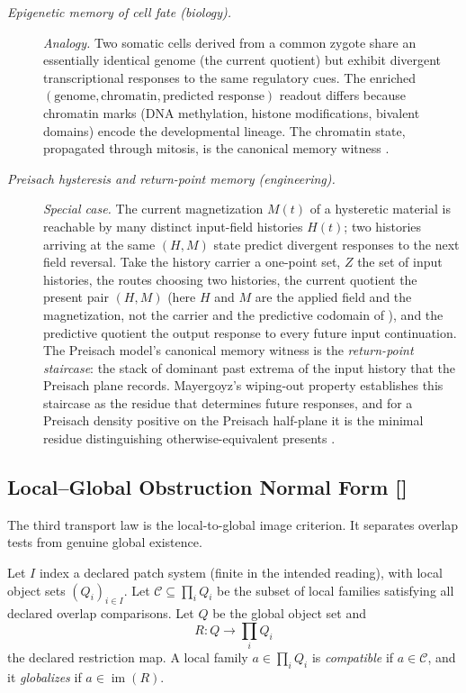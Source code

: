 \begin{description}
\item[\emph{Epigenetic memory of cell fate (biology).}] \textit{Analogy.}
Two somatic cells derived from a common zygote share an essentially
identical genome (the current quotient) but exhibit divergent
transcriptional responses to the same regulatory cues.  The
enriched
\((\text{genome}, \text{chromatin}, \text{predicted response})\)
readout differs because chromatin marks (DNA methylation, histone
modifications, bivalent domains) encode the developmental lineage.
The chromatin state, propagated through mitosis, is the canonical
memory witness \citep{Reik2007Epigenetic}.

\item[\emph{Preisach hysteresis and return-point memory
(engineering).}] \textit{Special case.}
The current magnetization \(M(t)\) of a hysteretic material is
reachable by many distinct input-field histories \(H(t)\); two
histories arriving at the same \((H, M)\) state predict divergent
responses to the next field reversal. Take the history carrier a one-point
set, \(Z\) the set of input histories, the routes choosing two histories, the
current quotient the present pair \((H,M)\) (here \(H\) and \(M\) are the applied field and the magnetization, not the carrier and the predictive codomain of ), and the predictive quotient the
output response to every future input continuation.  The Preisach model's
canonical memory witness is the \emph{return-point staircase}: the
stack of dominant past extrema of the input history that the
Preisach plane records.  Mayergoyz's wiping-out property
establishes this staircase as the residue that determines future
responses, and for a Preisach density positive on the Preisach
half-plane it is the minimal residue distinguishing
otherwise-equivalent presents \citep{Mayergoyz2003Hysteresis}.
\end{description}
\endgroup

\subsection{Local--Global Obstruction Normal Form [\texorpdfstring{}{F4}]}\label{sec:transport:local-global}

The third transport law is the local-to-global image criterion.  It
separates overlap tests from genuine global existence.

\begin{definition}\label{def:local-global-compat}
Let \(I\) index a declared patch system (finite in the intended reading), with local object sets
\((Q_i)_{i\in I}\).  Let \(\mathcal C\subseteq \prod_i Q_i\) be the
subset of local families satisfying all declared overlap comparisons.
Let \(Q\) be the global object set and
\[
  R:Q\to \prod_i Q_i
\]
the declared restriction map.  A local family \(a\in\prod_i Q_i\) is
\emph{compatible} if \(a\in\mathcal C\), and it \emph{globalizes} if
\(a\in\operatorname{im}(R)\).
\end{definition}

